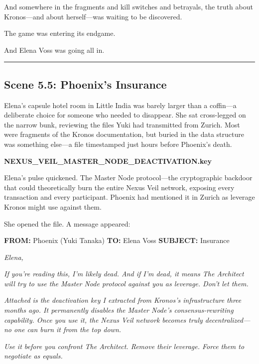 \documentclass[12pt,letterpaper]{book}
\begin{document}
And somewhere in the fragments and kill switches and betrayals, the truth about Kronos---and about herself---was waiting to be discovered.

The game was entering its endgame.

And Elena Voss was going all in.

\begin{center}\rule{0.5\linewidth}{0.5pt}\end{center}

\hypertarget{scene-5.5-phoenixs-insurance}{%
\subsection{Scene 5.5: Phoenix's Insurance}\label{scene-5.5-phoenixs-insurance}}

Elena's capsule hotel room in Little India was barely larger than a coffin---a deliberate choice for someone who needed to disappear. She sat cross-legged on the narrow bunk, reviewing the files Yuki had transmitted from Zurich. Most were fragments of the Kronos documentation, but buried in the data structure was something else---a file timestamped just hours before Phoenix's death.

\textbf{NEXUS\_VEIL\_MASTER\_NODE\_DEACTIVATION.key}

Elena's pulse quickened. The Master Node protocol---the cryptographic backdoor that could theoretically burn the entire Nexus Veil network, exposing every transaction and every participant. Phoenix had mentioned it in Zurich as leverage Kronos might use against them.

She opened the file. A message appeared:

\textbf{FROM:} Phoenix (Yuki Tanaka) \textbf{TO:} Elena Voss \textbf{SUBJECT:} Insurance

\emph{Elena,}

\emph{If you're reading this, I'm likely dead. And if I'm dead, it means The Architect will try to use the Master Node protocol against you as leverage. Don't let them.}

\emph{Attached is the deactivation key I extracted from Kronos's infrastructure three months ago. It permanently disables the Master Node's consensus-rewriting capability. Once you use it, the Nexus Veil network becomes truly decentralized---no one can burn it from the top down.}

\emph{Use it before you confront The Architect. Remove their leverage. Force them to negotiate as equals.}
\end{document}
